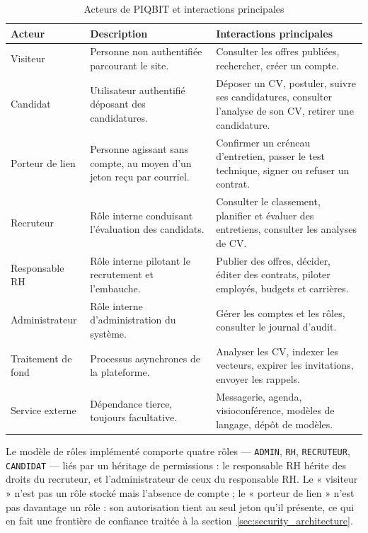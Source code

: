 \begin{table}[htbp]
  \centering
  \caption{Acteurs de PIQBIT et interactions principales}
  \label{tab:actors}
  \begin{tabularx}{\textwidth}{L{2.8cm} L{4.0cm} X}
    \toprule
    \textbf{Acteur} & \textbf{Description} & \textbf{Interactions principales} \\
    \midrule
    Visiteur
      & Personne non authentifiée parcourant le site.
      & Consulter les offres publiées, rechercher, créer un compte. \\
    Candidat
      & Utilisateur authentifié déposant des candidatures.
      & Déposer un CV, postuler, suivre ses candidatures, consulter l'analyse de son CV, retirer une candidature. \\
    Porteur de lien
      & Personne agissant sans compte, au moyen d'un jeton reçu par courriel.
      & Confirmer un créneau d'entretien, passer le test technique, signer ou refuser un contrat. \\
    Recruteur
      & Rôle interne conduisant l'évaluation des candidats.
      & Consulter le classement, planifier et évaluer des entretiens, consulter les analyses de CV. \\
    Responsable RH
      & Rôle interne pilotant le recrutement et l'embauche.
      & Publier des offres, décider, éditer des contrats, piloter employés, budgets et carrières. \\
    Administrateur
      & Rôle interne d'administration du système.
      & Gérer les comptes et les rôles, consulter le journal d'audit. \\
    Traitement de fond
      & Processus asynchrones de la plateforme.
      & Analyser les CV, indexer les vecteurs, expirer les invitations, envoyer les rappels. \\
    Service externe
      & Dépendance tierce, toujours facultative.
      & Messagerie, agenda, visioconférence, modèles de langage, dépôt de modèles. \\
    \bottomrule
  \end{tabularx}
\end{table}

Le modèle de rôles implémenté comporte quatre rôles — \texttt{ADMIN},
\texttt{RH}, \texttt{RECRUTEUR}, \texttt{CANDIDAT} — liés par un héritage de
permissions : le responsable RH hérite des droits du recruteur, et
l'administrateur de ceux du responsable RH. Le « visiteur » n'est pas un rôle
stocké mais l'absence de compte ; le « porteur de lien » n'est pas davantage un
rôle : son autorisation tient au seul jeton qu'il présente, ce qui en fait une
frontière de confiance traitée à la section~\ref{sec:security_architecture}.

